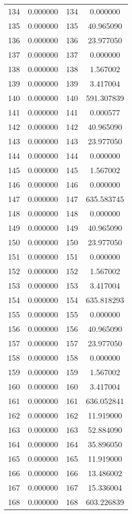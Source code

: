 \documentclass[12pt]{article}
\begin{document}
\begin{longtable}{@{}cccc@{}}
134 & 0.000000 & 134 & 0.000000 \\
135 & 0.000000 & 135 & 40.965090 \\
136 & 0.000000 & 136 & 23.977050 \\
137 & 0.000000 & 137 & 0.000000 \\
138 & 0.000000 & 138 & 1.567002 \\
139 & 0.000000 & 139 & 3.417004 \\
140 & 0.000000 & 140 & 591.307839 \\
141 & 0.000000 & 141 & 0.000577 \\
142 & 0.000000 & 142 & 40.965090 \\
143 & 0.000000 & 143 & 23.977050 \\
144 & 0.000000 & 144 & 0.000000 \\
145 & 0.000000 & 145 & 1.567002 \\
146 & 0.000000 & 146 & 0.000000 \\
147 & 0.000000 & 147 & 635.583745 \\
148 & 0.000000 & 148 & 0.000000 \\
149 & 0.000000 & 149 & 40.965090 \\
150 & 0.000000 & 150 & 23.977050 \\
151 & 0.000000 & 151 & 0.000000 \\
152 & 0.000000 & 152 & 1.567002 \\
153 & 0.000000 & 153 & 3.417004 \\
154 & 0.000000 & 154 & 635.818293 \\
155 & 0.000000 & 155 & 0.000000 \\
156 & 0.000000 & 156 & 40.965090 \\
157 & 0.000000 & 157 & 23.977050 \\
158 & 0.000000 & 158 & 0.000000 \\
159 & 0.000000 & 159 & 1.567002 \\
160 & 0.000000 & 160 & 3.417004 \\
161 & 0.000000 & 161 & 636.052841 \\
162 & 0.000000 & 162 & 11.919000 \\
163 & 0.000000 & 163 & 52.884090 \\
164 & 0.000000 & 164 & 35.896050 \\
165 & 0.000000 & 165 & 11.919000 \\
166 & 0.000000 & 166 & 13.486002 \\
167 & 0.000000 & 167 & 15.336004 \\
168 & 0.000000 & 168 & 603.226839 \\

\end{longtable}
\end{document}
